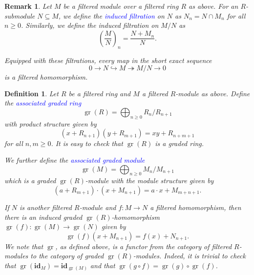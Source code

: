 \documentclass[11pt]{article}
\theoremstyle{thmstyle}
\theoremstyle{defstyle}
\newtheorem{definition}[theorem]{Definition}
\newtheorem{remark}[theorem]{Remark}
\newcommand{\id}{\mathbf{id}}
\newcommand{\onto}{\twoheadrightarrow}
\newcommand{\into}{\hookrightarrow}
\newcommand{\define}[1]{\textcolor{blue}{\textit{#1}}}
\renewcommand{\ge}{\geqslant}
\newcommand{\gr}{\operatorname{gr}}
\begin{document}
\begin{remark}
    Let $M$ be a filtered module over a filtered ring $R$ as above. For an $R$-submodule $N\subseteq M$, we define the \define{induced filtration} on $N$ as $N_n = N\cap M_n$ for all $n\ge 0$. 
    Similarly, we define the induced filtration on $M/N$ as 
    \begin{equation*}
        \left(\frac{M}{N}\right)_n = \frac{N + M_n}{N}.
    \end{equation*}

    Equipped with these filtrations, every map in the short exact sequence
    \begin{equation*}
        0\to N\into M\onto M/N\to 0
    \end{equation*}
    is a filtered homomorphism.
\end{remark}

\begin{definition}
    Let $R$ be a filtered ring and $M$ a filtered $R$-module as above. Define the \define{associated graded ring}
    \begin{equation*}
        \gr(R) = \bigoplus_{n\ge 0} R_n/R_{n + 1}
    \end{equation*}
    with product structure given by 
    \begin{equation*}
        (x + R_{n + 1})(y + R_{m + 1}) = xy + R_{n + m + 1}
    \end{equation*}
    for all $n, m\ge 0$. It is easy to check that $\gr(R)$ is a graded ring.

    We further define the \define{associated graded module}
    \begin{equation*}
        \gr(M) = \bigoplus_{n\ge 0} M_n/M_{n + 1}
    \end{equation*}
    which is a graded $\gr(R)$-module with the module structure given by 
    \begin{equation*}
        (a + R_{m + 1})\cdot(x + M_{n + 1}) = a\cdot x + M_{m + n + 1}.
    \end{equation*}

    If $N$ is another filtered $R$-module and $f\colon M\to N$ a filtered homomorphism, then there is an induced graded $\gr(R)$-homomorphism $\gr(f)\colon \gr(M)\to\gr(N)$ given by 
    \begin{equation*}
        \gr(f)\left(x + M_{n + 1}\right) = f(x) + N_{n + 1}.
    \end{equation*}
    We note that $\gr$, as defined above, is a functor from the category of filtered $R$-modules to the category of graded $\gr(R)$-modules. Indeed, it is trivial to check that $\gr(\id_M) = \id_{\gr(M)}$ and that $\gr(g\circ f) = \gr(g)\circ\gr(f)$.
\end{definition}
\end{document}
